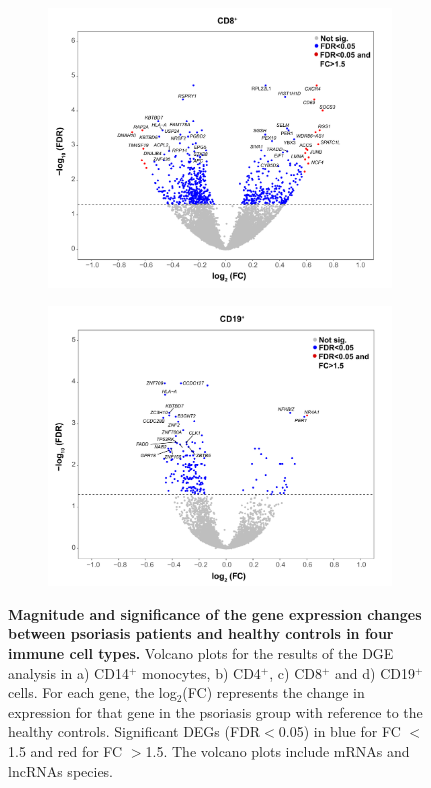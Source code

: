 \begin{figure}[htbp]
\begin{subfigure}{0.5\textwidth}
\centering
\includegraphics[width=\textwidth]{./Results2/pdfs/RNA_PS_CTL_CD8_volcano_plot}
\caption{\textbf{}}
\end{subfigure}%
\begin{subfigure}{0.5\textwidth}
\centering
\includegraphics[width=\textwidth]{./Results2/pdfs/RNA_PS_CTL_CD19_volcano_plot}
\caption{\textbf{}}
\end{subfigure}
\caption[Magnitude and significance of the gene expression changes between psoriasis patients and healthy controls in four immune cell types.]{\textbf{Magnitude and significance of the gene expression changes between psoriasis patients and healthy controls in four immune cell types.} Volcano plots for the results of the DGE analysis in a) CD14$^+$ monocytes, b) CD4$^+$, c) CD8$^+$ and d) CD19$^+$ cells. For each gene, the log$_2$(FC) represents the change in expression for that gene in the psoriasis group with reference to the healthy controls. Significant DEGs (FDR$<$0.05) in blue for FC $<$1.5 and red for FC $>$1.5. The volcano plots include mRNAs and lncRNAs species.}
\label{figure:RNAseq_PS_CTL_volcano_plots}
\end{figure} 


